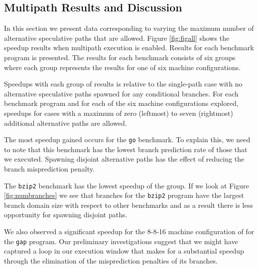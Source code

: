 %
\subsection{Multipath Results and Discussion}
%
In this section we present data corresponding to varying the
maximum number of alternative speculative paths that are allowed.
Figure \ref{fig:figall} shows the speedup results
when multipath execution is enabled.  Results for
each benchmark program is presented.  The results for each benchmark
consists of six groups where each group represents the results
for one of six machine configurations.

Speedups with each group of results is relative to the
single-path case with no alternative speculative paths spawned
for any conditional branches.  For each benchmark program and
for each of the six machine configurations explored, speedups
for cases with a maximum
of zero (leftmost) to seven (rightmost) additional alternative
paths are allowed.

The most speedup gained occurs for the {\tt go} benchmark.  
To explain this, we need
to note that this benchmark has the lowest branch prediction rate
of those that we executed.
Spawning disjoint alternative paths has the effect of reducing the
branch misprediction penalty.

The {\tt bzip2} benchmark has the lowest speedup of the group.  
If we look at Figure \ref{fig:numbranches} we 
see that branches for the {\tt bzip2} program have the
largest branch domain size with respect to other benchmarks and as a
result there is less opportunity for spawning disjoint paths.

We also observed a significant speedup for the 8-8-16 machine configuration
of for the {\tt gap} program.  
Our preliminary investigations suggest
that we might have captured
a loop in our execution window that makes for a substantial speedup 
through the elimination
of the misprediction penalties of its branches.
